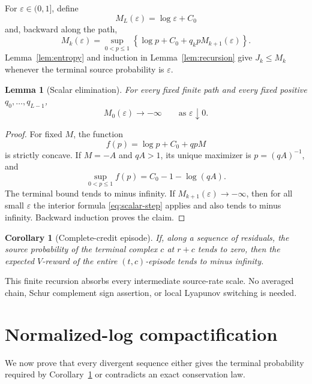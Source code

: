\documentclass[11pt]{article}
\newtheorem{lemma}[theorem]{Lemma}
\newtheorem{corollary}[theorem]{Corollary}
\theoremstyle{definition}
\begin{document}
For \(\varepsilon\in(0,1]\), define
\[
  M_L(\varepsilon)=\log\varepsilon+C_0
\]
and, backward along the path,
\begin{equation}\label{eq:envelope}
  M_k(\varepsilon)=
  \sup_{0<p\leq1}
  \left\{\log p+C_0+q_kpM_{k+1}(\varepsilon)\right\}.
\end{equation}
Lemma~\ref{lem:entropy} and induction in
Lemma~\ref{lem:recursion} give \(J_k\leq M_k\) whenever the terminal source
probability is \(\varepsilon\).

\begin{lemma}[Scalar elimination]\label{lem:scalar}
For every fixed finite path and every fixed positive \(q_0,\ldots,q_{L-1}\),
\begin{equation}\label{eq:scalar-limit}
  M_0(\varepsilon)\longrightarrow-\infty
  \qquad\text{as }\varepsilon\downarrow0.
\end{equation}
\end{lemma}

\begin{proof}
For fixed \(M\), the function
\[
  f(p)=\log p+C_0+qpM
\]
is strictly concave.  If \(M=-A\) and \(qA>1\), its unique maximizer is
\(p=(qA)^{-1}\), and
\begin{equation}\label{eq:scalar-step}
  \sup_{0<p\leq1}f(p)
  =C_0-1-\log(qA).
\end{equation}
The terminal bound tends to minus infinity.  If
\(M_{k+1}(\varepsilon)\to-\infty\), then for all small \(\varepsilon\) the
interior formula \eqref{eq:scalar-step} applies and also tends to minus
infinity.  Backward induction proves the claim.
\end{proof}

\begin{corollary}[Complete-credit episode]\label{cor:credit}
If, along a sequence of residuals, the source probability of the terminal
complex \(c\) at \(r+c\) tends to zero, then the expected \(V\)-reward of the
entire \((t,c)\)-episode tends to minus infinity.
\end{corollary}

This finite recursion absorbs every intermediate source-rate scale.  No
averaged chain, Schur complement sign assertion, or local Lyapunov switching
is needed.

\section{Normalized-log compactification}

We now prove that every divergent sequence either gives the terminal
probability required by Corollary~\ref{cor:credit} or contradicts an exact
conservation law.
\end{document}
